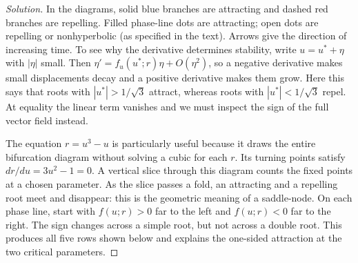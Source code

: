\documentclass[10pt]{amsart}
\newenvironment{solution}
{\begin{proof}[Solution]}
{\end{proof}}
\begin{document}
\begin{enumerate}[label=\arabic*), leftmargin=*, itemsep=1em]
\begin{solution}
In the diagrams, solid blue branches are attracting and dashed red branches are repelling. Filled phase-line dots are attracting; open dots are repelling or nonhyperbolic (as specified in the text). Arrows give the direction of increasing time.
To see why the derivative determines stability, write $u=u^*+\eta$ with $|\eta|$ small. Then $\eta'=f_u(u^*;r)\eta+O(\eta^2)$, so a negative derivative makes small displacements decay and a positive derivative makes them grow. Here this says that roots with $|u^*|>1/\sqrt3$ attract, whereas roots with $|u^*|<1/\sqrt3$ repel. At equality the linear term vanishes and we must inspect the sign of the full vector field instead.

The equation $r=u^3-u$ is particularly useful because it draws the entire bifurcation diagram without solving a cubic for each $r$. Its turning points satisfy $dr/du=3u^2-1=0$. A vertical slice through this diagram counts the fixed points at a chosen parameter. As the slice passes a fold, an attracting and a repelling root meet and disappear: this is the geometric meaning of a saddle-node. On each phase line, start with $f(u;r)>0$ far to the left and $f(u;r)<0$ far to the right. The sign changes across a simple root, but not across a double root. This produces all five rows shown below and explains the one-sided attraction at the two critical parameters.


\end{solution}
\end{enumerate}
\end{document}
